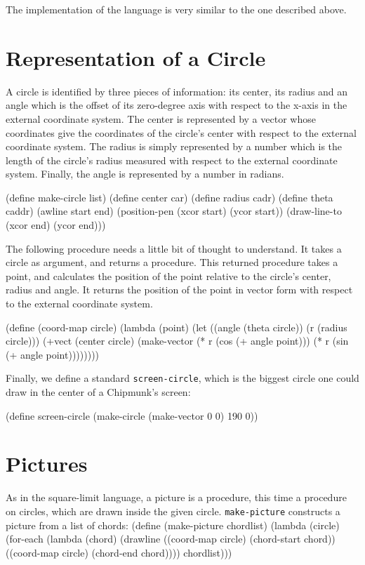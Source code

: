 The implementation of the language is very similar to the one
described above.

\section{Representation of a Circle}

A circle is identified by three pieces of information:  its center,
its radius and an angle which is the offset of its zero-degree axis
with respect to the x-axis in the external coordinate system.  The
center is represented by a vector whose coordinates give the coordinates
of the circle's center with respect to the external coordinate system.
The radius is simply represented by a number which is the length of the
circle's radius measured with respect to the external coordinate system.
Finally, the angle is represented by a number in radians.

\beginlisp
(define make-circle list)
(define center car)
(define radius cadr)
(define theta caddr)
\pbrk
(awline start end)
  (position-pen (xcor start) (ycor start))
  (draw-line-to (xcor end) (ycor end)))
\endlisp

The following procedure needs a little bit of thought to understand.  It takes a circle as
argument, and returns a procedure.  This returned procedure takes a point, and calculates
the position of the point relative to the circle's center, radius and
angle. It returns the position of the point in vector form with respect
to the external coordinate system.

\beginlisp
(define (coord-map circle)
  (lambda (point)
    (let ((angle (theta circle))
          (r (radius circle)))
      (+vect
        (center circle)
        (make-vector (* r (cos (+ angle point)))
                     (* r (sin (+ angle point))))))))
\endlisp

Finally, we define a standard {\tt screen-circle}, which is the
biggest circle one could draw in the center of a Chipmunk's
screen:

\beginlisp
(define screen-circle (make-circle (make-vector 0 0) 190 0))
\endlisp

\section{Pictures}

As in the square-limit language, a picture is a procedure, this time a
procedure on circles, which are drawn inside the given circle.
{\tt make-picture} constructs a picture from a list of chords:
\beginlisp
(define (make-picture chordlist)
  (lambda (circle)
    (for-each
     (lambda (chord)
       (drawline ((coord-map circle) (chord-start chord))
                 ((coord-map circle) (chord-end chord))))
     chordlist)))
\endlisp

